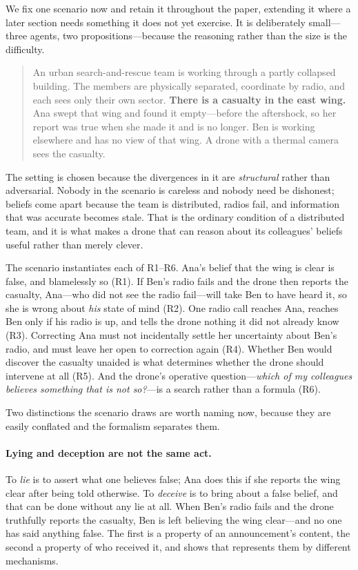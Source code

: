 \documentclass[11pt,a4paper]{article}
\begin{document}
We fix one scenario now and retain it throughout the paper, extending it where a later section
needs something it does not yet exercise. It is deliberately small---three agents, two
propositions---because the reasoning rather than the size is the difficulty.

\begin{quote}
An urban search-and-rescue team is working through a partly collapsed building. The members are
physically separated, coordinate by radio, and each sees only their own sector. \textbf{There is
a casualty in the east wing.} Ana swept that wing and found it empty---before the aftershock, so
her report was true when she made it and is no longer. Ben is working elsewhere and has no view
of that wing. A drone with a thermal camera sees the casualty.
\end{quote}

The setting is chosen because the divergences in it are \emph{structural} rather than
adversarial. Nobody in the scenario is careless and nobody need be dishonest; beliefs come apart
because the team is distributed, radios fail, and information that was accurate becomes stale.
That is the ordinary condition of a distributed team, and it is what makes a drone that can
reason about its colleagues' beliefs useful rather than merely clever.

The scenario instantiates each of R1--R6. Ana's belief that the wing is clear is false, and
blamelessly so (R1). If Ben's radio fails and the drone then reports the casualty, Ana---who did
not see the radio fail---will take Ben to have heard it, so she is wrong about \emph{his} state of
mind (R2). One radio call reaches Ana, reaches Ben only if his radio is up, and tells the drone
nothing it did not already know (R3). Correcting Ana must not incidentally settle her
uncertainty about Ben's radio, and must leave her open to correction again (R4). Whether Ben
would discover the casualty unaided is what determines whether the drone should intervene at all
(R5). And the drone's operative question---\emph{which of my colleagues believes something that
is not so?}---is a search rather than a formula (R6).

Two distinctions the scenario draws are worth naming now, because they are easily conflated and
the formalism separates them.

\paragraph{Lying and deception are not the same act.}
To \emph{lie} is to assert what one believes false; Ana does this if she reports the wing clear
after being told otherwise. To \emph{deceive} is to bring about a false belief, and that can be
done without any lie at all. When Ben's radio fails and the drone truthfully reports the
casualty, Ben is left believing the wing clear---and no one has said anything false. The first is
a property of an announcement's content, the second a property of who received it, and
 shows that \delhi{} represents them by different mechanisms.
\end{document}
